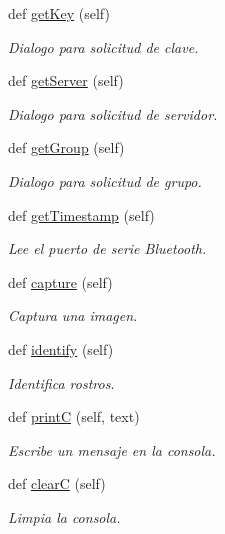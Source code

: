 \begin{DoxyCompactItemize}
def \mbox{\hyperlink{classfacepi_1_1_face_pi_af0325d200c0071bffaa042c128b5abac}{get\+Key}} (self)
\begin{DoxyCompactList}\small\item\em Dialogo para solicitud de clave. \end{DoxyCompactList}\item 
def \mbox{\hyperlink{classfacepi_1_1_face_pi_a15ff7fa69bb7b967444a659fdb66f7b9}{get\+Server}} (self)
\begin{DoxyCompactList}\small\item\em Dialogo para solicitud de servidor. \end{DoxyCompactList}\item 
def \mbox{\hyperlink{classfacepi_1_1_face_pi_a399f4c1740f88e9b742051a8d2332f55}{get\+Group}} (self)
\begin{DoxyCompactList}\small\item\em Dialogo para solicitud de grupo. \end{DoxyCompactList}\item 
def \mbox{\hyperlink{classfacepi_1_1_face_pi_ac7c8594736211d56756975342d24934f}{get\+Timestamp}} (self)
\begin{DoxyCompactList}\small\item\em Lee el puerto de serie Bluetooth. \end{DoxyCompactList}\item 
def \mbox{\hyperlink{classfacepi_1_1_face_pi_aa6a20d44bd85ecbf4aaa6390707e9ffe}{capture}} (self)
\begin{DoxyCompactList}\small\item\em Captura una imagen. \end{DoxyCompactList}\item 
def \mbox{\hyperlink{classfacepi_1_1_face_pi_aabccf277e0113ec07ab30d74fbbf261e}{identify}} (self)
\begin{DoxyCompactList}\small\item\em Identifica rostros. \end{DoxyCompactList}\item 
def \mbox{\hyperlink{classfacepi_1_1_face_pi_ac94b516a6dd221032d2ec103f8af3242}{printC}} (self, text)
\begin{DoxyCompactList}\small\item\em Escribe un mensaje en la consola. \end{DoxyCompactList}\item 
def \mbox{\hyperlink{classfacepi_1_1_face_pi_a8e4d19c4f06839b99a061844243668bd}{clearC}} (self)
\begin{DoxyCompactList}\small\item\em Limpia la consola. \end{DoxyCompactList}\item 

\end{DoxyCompactItemize}
